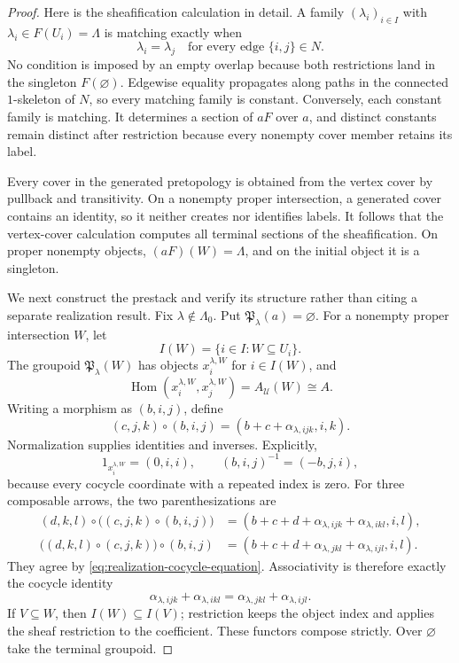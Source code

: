 \begin{proof}
Here is the sheafification calculation in detail.  A family
\((\lambda_i)_{i\in I}\) with \(\lambda_i\in F(U_i)=\Lambda\) is matching
exactly when
\[
 \lambda_i=\lambda_j
 \quad\text{for every edge }\{i,j\}\in N.
\]
No condition is imposed by an empty overlap because both restrictions land
in the singleton \(F(\varnothing)\).  Edgewise equality propagates along
paths in the connected \(1\)-skeleton of \(N\), so every matching family is
constant.  Conversely, each constant family is matching.  It determines a
section of \(aF\) over \(a\), and distinct constants remain distinct after
restriction because every nonempty cover member retains its label.

Every cover in the generated pretopology is obtained from the vertex cover
by pullback and transitivity.  On a nonempty proper intersection, a generated
cover contains an identity, so it neither creates nor identifies labels.
It follows that the vertex-cover calculation computes all terminal sections
of the sheafification.  On proper nonempty objects,
\((aF)(W)=\Lambda\), and on the initial object it is a singleton.

We next construct the prestack and verify its structure rather than citing a
separate realization result.  Fix \(\lambda\notin\Lambda_0\).  Put
\(\mathfrak P_\lambda(a)=\varnothing\).  For a nonempty proper intersection
\(W\), let
\[
 I(W)=\{i\in I:W\subseteq U_i\}.
\]
The groupoid \(\mathfrak P_\lambda(W)\) has objects
\(x_i^{\lambda,W}\) for \(i\in I(W)\), and
\[
 \operatorname{Hom}(x_i^{\lambda,W},x_j^{\lambda,W})
 =A_{\mathcal U}(W)\cong A.
\]
Writing a morphism as \((b,i,j)\), define
\begin{equation}\label{eq:twisted-composition}
 (c,j,k)\circ(b,i,j)
 =(b+c+\alpha_{\lambda,ijk},i,k).
\end{equation}
Normalization supplies identities and inverses.  Explicitly,
\[
 1_{x_i^{\lambda,W}}=(0,i,i),
 \qquad
 (b,i,j)^{-1}=(-b,j,i),
\]
because every cocycle coordinate with a repeated index is zero.  For three
composable arrows, the two parenthesizations are
\[
\begin{aligned}
 (d,k,l)\circ\bigl((c,j,k)\circ(b,i,j)\bigr)
 &=(b+c+d+\alpha_{\lambda,ijk}
       +\alpha_{\lambda,ikl},i,l),\\
 \bigl((d,k,l)\circ(c,j,k)\bigr)\circ(b,i,j)
 &=(b+c+d+\alpha_{\lambda,jkl}
       +\alpha_{\lambda,ijl},i,l).
\end{aligned}
\]
They agree by \eqref{eq:realization-cocycle-equation}.  Associativity is
therefore exactly the cocycle identity
\[
 \alpha_{\lambda,ijk}+\alpha_{\lambda,ikl}
 =\alpha_{\lambda,jkl}+\alpha_{\lambda,ijl}.
\]
If \(V\subseteq W\), then \(I(W)\subseteq I(V)\); restriction keeps the
object index and applies the sheaf restriction to the coefficient.  These
functors compose strictly.  Over \(\varnothing\) take the terminal groupoid.


\end{proof}
